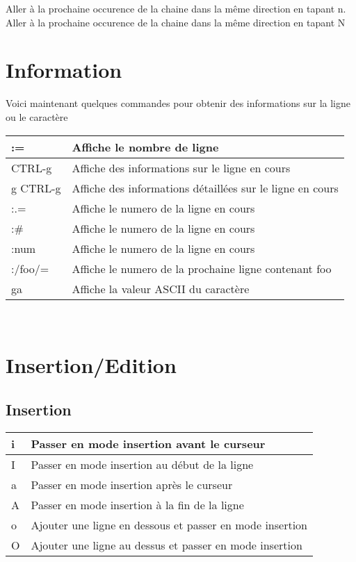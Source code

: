 \documentclass{article}
\begin{document}
\noindent
Aller à la prochaine occurence de la chaine dans la même direction en tapant n.\\
Aller à la prochaine occurence de la chaine dans la même direction en tapant N

\section{Information}
Voici maintenant quelques commandes pour obtenir des informations sur la ligne ou le caractère\\


\begin{tabular}{|p{3cm}| l|  }
	\hline
	:= & Affiche le nombre de ligne\\ \hline
	CTRL-g & Affiche des informations sur le ligne en cours\\ \hline
	g CTRL-g & Affiche des informations détaillées sur le ligne en cours\\ \hline
	:.=  & Affiche le numero de la ligne en cours\\ \hline
	:\#   & Affiche le numero de la ligne en cours\\ \hline
	:num & Affiche le numero de la ligne en cours\\ \hline
	:/foo/= & Affiche le numero de la prochaine ligne contenant foo\\ \hline
	ga & Affiche la valeur ASCII du caractère\\ \hline
\end{tabular}\\

\section{Insertion/Edition}
\subsection{Insertion}
\begin{tabular}{|p{3cm}| l|  }
	\hline
	i & Passer en mode insertion avant le curseur\\ \hline
	I & Passer en mode insertion au début de la ligne\\ \hline
	a & Passer en mode insertion après le curseur\\ \hline
	A & Passer en mode insertion à la fin de la ligne\\ \hline
	o & Ajouter une ligne en dessous et passer en mode insertion \\ \hline
	O & Ajouter une ligne au dessus et passer en mode insertion \\ \hline
\end{tabular}\\
\end{document}
